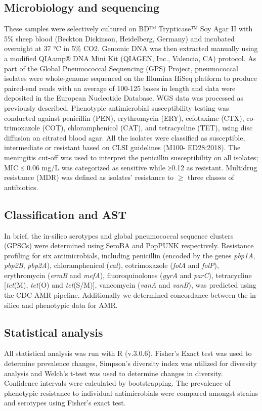 \documentclass{article}
\begin{document}
\subsection{Microbiology and sequencing}
These samples were selectively cultured on BD™ Trypticase™ Soy Agar II with 5\% sheep blood (Beckton Dickinson, Heidelberg, Germany) and incubated overnight at 37 °C in 5\% CO2. Genomic DNA was then extracted manually using a modified QIAamp® DNA Mini Kit (QIAGEN, Inc., Valencia, CA) protocol. As part of the Global Pneumococcal Sequencing (GPS) Project, pneumococcal isolates were whole-genome sequenced on the Illumina HiSeq platform to produce paired-end reads with an average of 100-125 bases in length and data were deposited in the European Nucleotide Database. WGS data was processed as previously described\cite{gladstoneInternationalGenomicDefinition2019}. Phenotypic antimicrobial susceptibility testing was conducted against penicillin (PEN), erythromycin (ERY), cefotaxime (CTX), co-trimoxazole (COT), chloramphenicol (CAT), and tetracycline (TET), using disc diffusion on citrated blood agar. All the isolates were classified as susceptible, intermediate or resistant based on CLSI guidelines (M100- ED28:2018). The meningitis cut-off was used to interpret the penicillin susceptibility on all isolates; MIC ≤ 0.06 mg/L was categorized as sensitive while ≥0.12 as resistant. Multidrug resistance (MDR) was defined as isolates’ resistance to $≥$ three classes of antibiotics.
\subsection{Classification and AST}
In brief, the in-silico serotypes and global pneumococcal sequence clusters (GPSCs) were determined using SeroBA \cite{eppingSeroBARapidHighthroughput2018} and PopPUNK \cite{leesFastFlexibleBacterial2019} respectively. Resistance profiling for six antimicrobials, including penicillin (encoded by the genes \textit{pbp1A}, \textit{pbp2B}, \textit{pbp2A}), chloramphenicol (\textit{cat}), cotrimoxazole (\textit{folA} and \textit{folP}), erythromycin (\textit{ermB} and \textit{mefA}), fluoroquinolones (\textit{gyrA} and \textit{parC}), tetracycline [\textit{tet}(M), \textit{tet}(O) and \textit{tet}(S/M)], vancomycin (\textit{vanA} and \textit{vanB}), was predicted using the CDC-AMR pipeline\cite{benjamesmetcalfBenJamesMetcalfSangerSPN2016}. Additionally we determined concordance between the in-silico and phenotypic data for AMR. 
\subsection{Statistical analysis}
All statistical analysis was run with R (v.3.0.6). Fisher’s Exact test was used to determine prevalence changes, Simpson’s diversity index was utilized for diversity analysis \cite{simpsonMeasurementDiversity1949} and Welch's t-test was used to determine changes in diversity. Confidence intervals were calculated by bootstrapping. The prevalence of phenotypic resistance to individual antimicrobials were compared amongst strains and serotypes using Fisher’s exact test.
\end{document}
